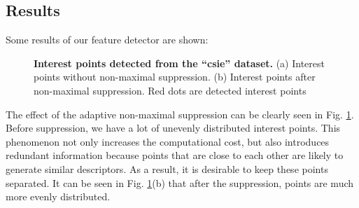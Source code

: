 \documentclass[a4paper]{article}
\begin{document}
\subsection{Results}
Some results of our feature detector are shown: \\
\begin{figure}[h]
  \centering
  \hspace{1.0cm}
  \caption{\textbf{Interest points detected from the ``csie'' dataset.} (a) Interest points without non-maximal suppression. (b) Interest points after non-maximal suppression. Red dots are detected interest points}
  \label{fig:csie}
\end{figure}

The effect of the adaptive non-maximal suppression can be clearly seen in Fig. \ref{fig:csie}. Before suppression, we have a lot of unevenly distributed interest points. This phenomenon not only increases the computational cost, but also introduces redundant information because points that are close to each other are likely to generate similar descriptors. As a result, it is desirable to keep these points separated. It can be seen in Fig. \ref{fig:csie}(b) that after the suppression, points are much more evenly distributed. \\
\end{document}
